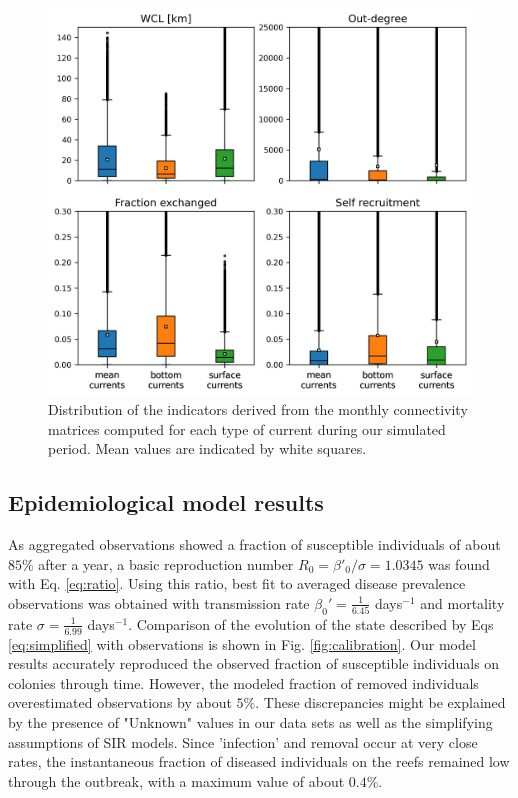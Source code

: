 \begin{figure}
    \centering
    \includegraphics[width=.9\textwidth]{chapters/sctld/figures/connect_paper.jpg}
    \caption{Distribution of the indicators derived from the monthly connectivity matrices computed for each type of current during our simulated period. Mean values are indicated by white squares.}
    \label{fig:connect}
\end{figure}

\subsection{Epidemiological model results}

As aggregated observations showed a fraction of susceptible individuals of about $85\%$ after a year, a basic reproduction number $R_0=\beta'_0/\sigma=1.0345$ was found with Eq. \ref{eq:ratio}. Using this ratio, best fit to averaged disease prevalence observations was obtained with transmission rate $\beta_0'=\frac{1}{6.45}$ days$^{-1}$ and mortality rate $\sigma=\frac{1}{6.99}$ days$^{-1}$. Comparison of the evolution of the state described by Eqs \ref{eq:simplified} with observations is shown in Fig. \ref{fig:calibration}. Our model results accurately reproduced the observed fraction of susceptible individuals on colonies through time. However, the modeled fraction of removed individuals overestimated observations by about $5\%$. These discrepancies might be explained by the presence of "Unknown" values in our data sets as well as the simplifying assumptions of SIR models. Since 'infection' and removal occur at very close rates, the instantaneous fraction of diseased individuals on the reefs remained low through the outbreak, with a maximum value of about $0.4\%$.

